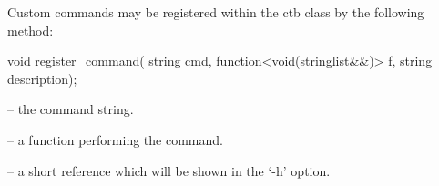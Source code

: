 Custom commands may be registered within the ctb class by the following method:

\mybeginfig
\begin{code}
void register_command( string cmd, function<void(stringlist&&)> f,
  string description);
\end{code}

\begin{description}
\item {} -- the command string.
\item {} -- a function performing the command.
\item {} -- a short reference which will be shown in the `-h' option.
\end{description}

  


